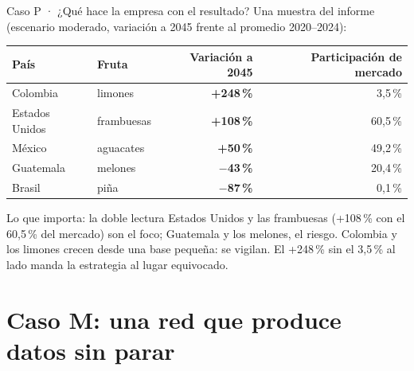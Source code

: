 \documentclass{beamer}
\begin{document}
\begin{frame}{Caso P · ¿Qué hace la empresa con el resultado?}
\small
Una muestra del informe (escenario moderado, variación a 2045 frente al promedio 2020--2024):

\vspace{0.1cm}
\begin{center}
\scriptsize
\begin{tabular}{@{}llrr@{}}
\toprule
\textbf{País} & \textbf{Fruta} & \textbf{Variación a 2045} & \textbf{Participación de mercado} \\
\midrule
\rowcolor{grisclaro} Colombia & limones & \textcolor{verdeok}{\textbf{+248\,\%}} & 3,5\,\% \\
Estados Unidos & frambuesas & \textcolor{verdeok}{\textbf{+108\,\%}} & 60,5\,\% \\
\rowcolor{grisclaro} México & aguacates & \textcolor{verdeok}{\textbf{+50\,\%}} & 49,2\,\% \\
Guatemala & melones & \textcolor{rojoal}{\textbf{$-$43\,\%}} & 20,4\,\% \\
\rowcolor{grisclaro} Brasil & piña & \textcolor{rojoal}{\textbf{$-$87\,\%}} & 0,1\,\% \\
\bottomrule
\end{tabular}
\end{center}
\pause
\begin{alertblock}{Lo que importa: la doble lectura}
Estados Unidos y las frambuesas (+108\,\% con el 60,5\,\% del mercado) son el foco; Guatemala y los melones, el riesgo. Colombia y los limones crecen desde una base pequeña: se vigilan. El +248\,\% sin el 3,5\,\% al lado manda la estrategia al lugar equivocado.
\end{alertblock}
\end{frame}

\section{Caso M: una red que produce datos sin parar}
\end{document}
